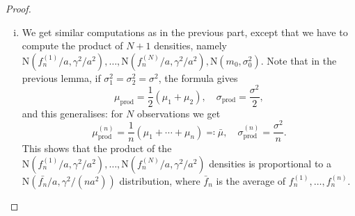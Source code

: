 \documentclass{article}
\theoremstyle{plain}
\theoremstyle{remark}
\newcommand{\Rm}{\mathrm}
\newcommand\ceq\coloneqq %
\newcommand\pro{_\Rm{prod}}
\begin{document}
\begin{proof}
\begin{enumerate}[(i)]
\begin{mdframed}
	\begin{proof}
		Since we are discussing proportionality, we only care about the exponents. We have
		\begin{align*}
			\frac{(x - \mu_1)^2}{\sigma_1^2} + \frac{(x - \mu_2)^2}{\sigma_2^2} &= \frac{(\sigma_1^2 + \sigma_2^2) x^2 - 2 (\mu_1\sigma_2^2 + \mu_2 \sigma_1^2)x  +  \mu_1^2\sigma_2^2 + \mu_2^2\sigma_1^2}{\sigma_1^2\sigma_2^2} \\
			&= \frac{x^2 - 2 \frac{\mu_1\sigma_2^2 + \mu_2\sigma_1^2}{\sigma_1^2 + \sigma_2^2} x + \frac{\mu_1^2\sigma_2^2 + \mu_2^2\sigma_1^2}{\sigma_1^2 + \sigma_2^2}}{\frac{\sigma_1^2\sigma_2^2}{\sigma_1^2 + \sigma_2^2}} \\
			&= \frac{\qty(x - \frac{\mu_1\sigma_2^2 + \mu_2\sigma_1^2}{\sigma_1^2 + \sigma_2^2})^2}{\frac{\sigma_1^2\sigma_2^2}{\sigma_1^2 + \sigma_2^2}} + C,
		\end{align*}
	where $C$ is some constant independent of $x$. The claim follows. 
	\end{proof}
\end{mdframed}
Plugging in our values we can compute the posterior density: it is an $\Rm N(\mu\pro, \sigma\pro^2)$ density where
\begin{align*}
	\mu\pro &= \frac{\frac{f_n\sigma_0^2}{a} + \frac{m_0\gamma^2}{a^2}}{\frac{\gamma^2}{a^2} + \sigma_0^2}  = \frac{a f_n \sigma_0^2 + m_0\gamma^2}{\gamma^2 + a^2\sigma_0^2}, \\
	\sigma\pro^2 &= \frac{\frac{\sigma_0^2\gamma^2}{a^2}}{\frac{\gamma^2}{a^2} + \sigma_0^2} = \frac{\sigma_0^2 \gamma^2}{\gamma^2 + a^2\sigma_0^2}. 
\end{align*}%

\item We get similar computations as in the previous part, except that we have to compute the product of $N + 1$ densities, namely $\Rm N(f_n^{(1)}/a, \gamma^2/a^2), \dotsc, \Rm N(f_n^{(N)}/a, \gamma^2/a^2), \Rm N(m_0, \sigma_0^2)$. 
Note that in the previous lemma, if $\sigma_1^2 = \sigma_2^2  = \sigma^2$, the formula gives
\[
\mu\pro = \frac12(\mu_1 + \mu_2), \quad \sigma\pro = \frac{\sigma^2}{2}, 
\]
and this generalises: for $N$ observations we get 
\[
\mu\pro^{(n)} = \frac1n (\mu_1 + \dotsb + \mu_n) \eqqcolon \bar\mu, \quad\sigma\pro^{(n)} = \frac{\sigma^2}{n}. 
\]
This shows that the product of the $\Rm N(f_n^{(1)}/a, \gamma^2/a^2), \dotsc, \Rm N(f_n^{(N)}/a, \gamma^2/a^2)$ densities is proportional to a $\Rm N(\bar{f_n}/a, \gamma^2/(na^2))$ distribution, where $\bar f_n$ is the average of $f_n^{(1)}, \dotsc, f_n^{(n)}$. 


\end{enumerate}
\end{proof}
\end{document}
